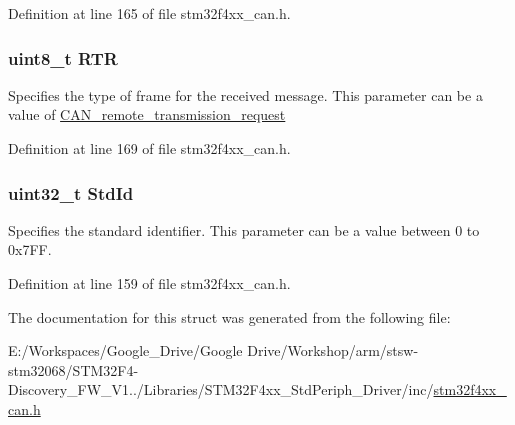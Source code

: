 Definition at line 165 of file stm32f4xx\-\_\-can.\-h.

\hypertarget{struct_can_rx_msg_a131e825d532b66f27dbb74aa80864d37}{
\subsubsection[{R\-T\-R}]{\setlength{\rightskip}{0pt plus 5cm}uint8\-\_\-t R\-T\-R}}\label{struct_can_rx_msg_a131e825d532b66f27dbb74aa80864d37}
Specifies the type of frame for the received message. This parameter can be a value of \hyperlink{group___c_a_n__remote__transmission__request}{C\-A\-N\-\_\-remote\-\_\-transmission\-\_\-request} 

Definition at line 169 of file stm32f4xx\-\_\-can.\-h.

\hypertarget{struct_can_rx_msg_a511131786af8d1534273e48ea2052245}{
\subsubsection[{Std\-Id}]{\setlength{\rightskip}{0pt plus 5cm}uint32\-\_\-t Std\-Id}}\label{struct_can_rx_msg_a511131786af8d1534273e48ea2052245}
Specifies the standard identifier. This parameter can be a value between 0 to 0x7\-F\-F. 

Definition at line 159 of file stm32f4xx\-\_\-can.\-h.



The documentation for this struct was generated from the following file\-:\begin{DoxyCompactItemize}
\item 
E\-:/\-Workspaces/\-Google\-\_\-\-Drive/\-Google Drive/\-Workshop/arm/stsw-\/stm32068/\-S\-T\-M32\-F4-\/\-Discovery\-\_\-\-F\-W\-\_\-\-V1../\-Libraries/\-S\-T\-M32\-F4xx\-\_\-\-Std\-Periph\-\_\-\-Driver/inc/\hyperlink{stm32f4xx__can_8h}{stm32f4xx\-\_\-can.\-h}\end{DoxyCompactItemize}
